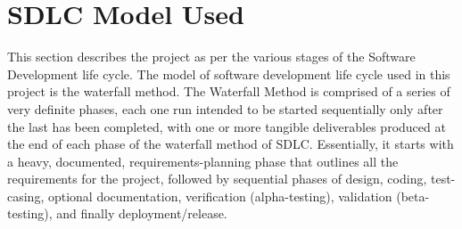 \pagebreak
\section{SDLC Model Used}
This section describes the project as per the various stages of the Software Development life
cycle. The model of software development life cycle used in this project is the waterfall method.
The Waterfall Method is comprised of a series of very definite phases, each one run intended to
be started sequentially only after the last has been completed, with one or more tangible
deliverables produced at the end of each phase of the waterfall method of SDLC. Essentially, it
starts with a heavy, documented, requirements-planning phase that outlines all the requirements
for the project, followed by sequential phases of design, coding, test-casing, optional
documentation, verification (alpha-testing), validation (beta-testing), and finally
deployment/release.\\


